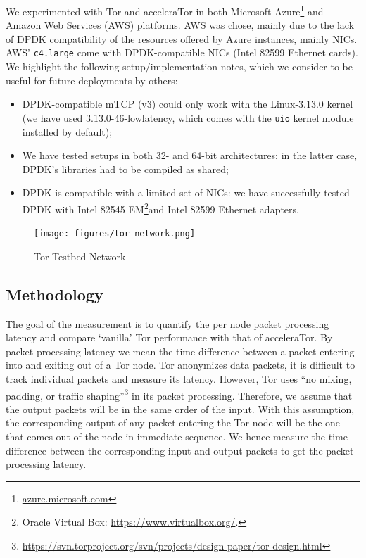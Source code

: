 \documentclass[conference]{IEEEtran}
\begin{document}
We experimented with Tor and acceleraTor in both Microsoft Azure\footnote{\url{azure.microsoft.com}} and Amazon Web Services (AWS) platforms. AWS was chose, mainly due to the lack of DPDK compatibility of the resources offered by Azure instances, mainly NICs. AWS' \verb+c4.large+ come with DPDK-compatible NICs (Intel 82599 Ethernet cards). We highlight the following setup\slash implementation notes, which we consider to be useful for future deployments by others:

\begin{itemize}
	\item DPDK-compatible mTCP (v3) could only work with the Linux-3.13.0 kernel (we have used 
		3.13.0-46-lowlatency, which comes with the \verb+uio+ kernel module installed 
		by default);
	\item We have tested setups in both 32- and 64-bit architectures: in the 
		latter case, DPDK's libraries had to be compiled as shared;
	\item DPDK is compatible with a limited set of NICs: we have successfully 
		tested DPDK with Intel 82545 EM\footnote{Oracle Virtual Box: \url{https://www.virtualbox.org/}.}and Intel 82599 Ethernet adapters.
\end{itemize}

\begin{figure}[h!]
	\centering
	\texttt{[image: figures/tor-network.png]}
	\cprotect\caption{Tor Testbed Network}
	\label{fig:tor-setup}
\end{figure}

\subsection{Methodology}
\label{subsec:methodology}

The goal of the measurement is to quantify the per node packet processing latency and compare `vanilla' Tor performance with that of acceleraTor. By packet processing latency we mean the time difference between a packet entering into and exiting out of a Tor node. Tor anonymizes data packets, it is difficult to track individual packets and measure its latency. However, Tor uses ``no mixing, padding, or traffic shaping''\footnote{\url{https://svn.torproject.org/svn/projects/design-paper/tor-design.html}} in its packet processing. Therefore, we assume that the output packets will be in the same order of the input. With this assumption, the corresponding output of any packet entering the Tor node will be the one that comes out of the node in immediate sequence. We hence measure the time difference between the corresponding input and output packets to get the packet processing latency.
\end{document}
